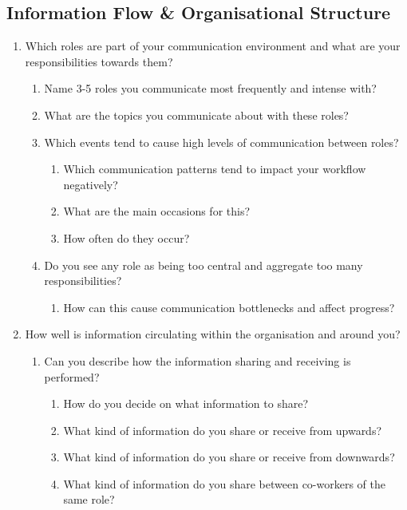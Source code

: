 \subsection*{Information Flow \& Organisational Structure}

\begin{enumerate}
  \item Which roles are part of your communication environment and what are your responsibilities towards them?
  
  \begin{enumerate}
     \item Name 3-5 roles you communicate most frequently and intense with?
     \item What are the topics you communicate about with these roles?
     \item Which events tend to cause high levels of communication between roles?
    
    \begin{enumerate}
       \item Which communication patterns tend to impact your workflow negatively?
       \item What are the main occasions for this?
       \item How often do they occur?
     \end{enumerate}
    
    \item Do you see any role as being too central and aggregate too many responsibilities?
  
        \begin{enumerate}
          \item How can this cause communication bottlenecks and affect progress?
        \end{enumerate}
  \end{enumerate}

  \item How well is information circulating within the organisation and around you?
  
    \begin{enumerate}
      \item Can you describe how the information sharing and receiving is performed?
      
      \begin{enumerate}
         \item How do you decide on what information to share?
         \item What kind of information do you share or receive from upwards?
         \item What kind of information do you share or receive from downwards?
         \item What kind of information do you share between co-workers of the same role?
      \end{enumerate}
    

\end{enumerate}
\end{enumerate}
